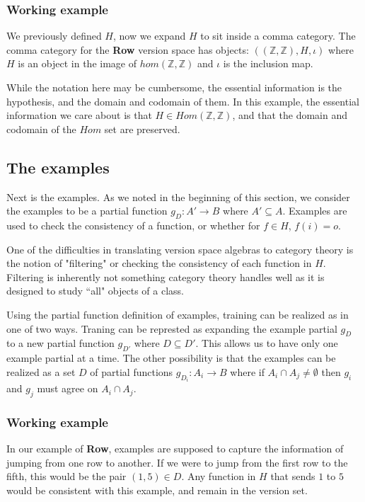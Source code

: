 \documentclass{article}
\theoremstyle{definition}
\begin{document}
\subsubsection{Working example}
We previously defined $H$, now we expand $H$ to sit inside a comma category. The comma category for the \textbf{Row} version space has objects: $((\mathbb{Z}, \mathbb{Z}), H, \iota)$ where $H$ is an object in the image of $hom(\mathbb{Z},\mathbb{Z})$ and $\iota$ is the inclusion map. 

While the notation here may be cumbersome, the essential information is the hypothesis, and the domain and codomain of them.  In this example, the essential information we care about is that $H \in Hom(\mathbb{Z}, \mathbb{Z})$, and that the domain and codomain of the $Hom$ set are preserved.  

\subsection{The examples}
Next is the examples. As we noted in the beginning of this section, we consider the examples to be a partial function $g_D: A' \rightarrow B$ where $A' \subseteq A$. Examples are used to check the consistency of a function, or whether for $f\in H$, $f(i) = o$. 

One of the difficulties in translating version space algebras to category theory is the notion of "filtering" or checking the consistency of each function in $H$. Filtering is inherently not something category theory handles well as it is designed to study ``all" objects of a class.

Using the partial function definition of examples, training can be realized as in one of two ways. Traning can be represted as expanding the example partial $g_D$ to a new partial function $g_{D'}$ where $D\subseteq D'$. This allows us to have only one example partial at a time. The other possibility is that the examples can be realized as a set $D$ of partial functions $g_{D_i}: A_i \rightarrow B $ where if $A_i \cap A_j \ne \emptyset$ then $g_i$ and $g_j$ must agree on $A_i \cap A_j$.

\subsubsection{Working example}
In our example of \textbf{Row}, examples are supposed to capture the information of jumping from one row to another. If we were to jump from the first row to the fifth, this would be the pair $(1,5)\in D$. Any function in $H$ that sends $1$ to $5$ would be consistent with this example, and remain in the version set. 
\end{document}
